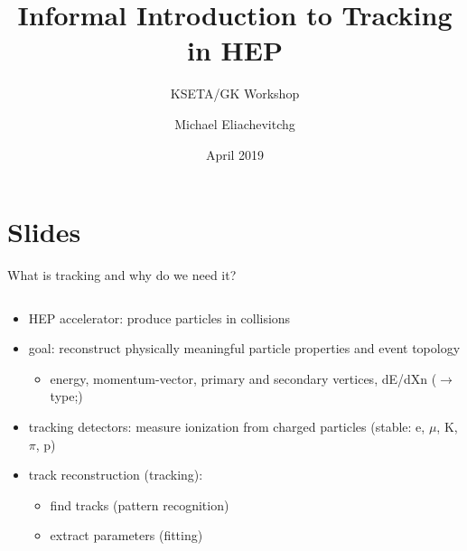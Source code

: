 \documentclass[presentation]{etp-beamer-fancy}
\author{Michael Eliachevitchg}
\date{April 2019}
\title{Informal Introduction to Tracking in HEP}
\subtitle{KSETA/GK Workshop}
\institute{ETP -- KIT}
\begin{document}
\maketitle
\section*{Slides}
\label{sec:orgab95d13}
\begin{frame}[label={sec:org387b453}]{What is tracking and why do we need it?}
\begin{column}{0.6\columnwidth}
\begin{itemize}
\item HEP accelerator: produce particles in collisions
\item goal: reconstruct physically meaningful particle properties and event topology
\begin{itemize}
\item energy, momentum-vector, primary and secondary vertices, dE/dXn (\(\rightarrow\) type;)
\end{itemize}
\item tracking detectors: measure ionization from charged particles (stable: e, \(\mu\),
K, \(\pi\), p)
\item track reconstruction (tracking):
\begin{itemize}
\item find tracks (pattern recognition)
\item extract parameters (fitting)
\end{itemize}
\end{itemize}
\end{column}
\begin{column}{0.4\columnwidth}
\begin{center}

\end{center}
\end{column}
\end{frame}
\end{document}
